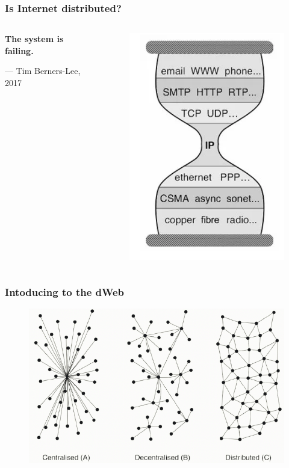 \begin{frame}
\frametitle{ Is Internet distributed? }
\begin{columns}[T] %
\begin{column}{5cm} %
  \begin{minipage}[c][0.5 \textheight][c]{\linewidth}
    \textbf{The system is failing.\cite{bernerslee2017}}
    \begin{flushright}
     --- Tim Berners-Lee, 2017
    \end{flushright}
  \end{minipage}
\end{column}
\begin{column}{5cm} %
  \begin{figure}[h]
  \centering
  \includegraphics[width=0.7\linewidth]{hourglass.png}
  \end{figure}
\end{column}
\end{columns}
\end{frame}

\begin{frame}
\frametitle{ Intoducing to the dWeb }
  \begin{figure}[h]
  \centering
  \includegraphics[width=0.7\linewidth]{lopologic.png}\cite{mozilla2018}
  \end{figure}
\end{frame}

